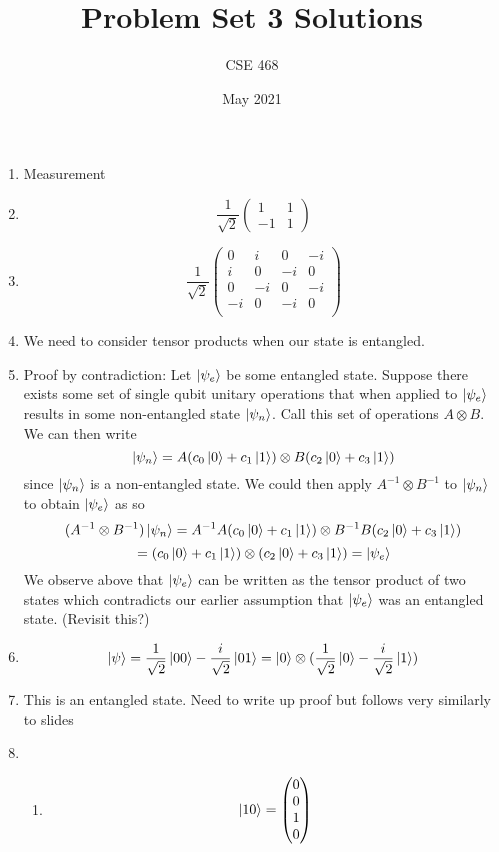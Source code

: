 \documentclass[12pt]{article}
\title{Problem Set 3 Solutions}
\author{CSE 468}
\date{May 2021}
\begin{document}
\maketitle

\begin{enumerate}[font=\bfseries]
    \item Measurement
    \item \[ \frac{1}{\sqrt{2}}\begin{pmatrix}
        1 & 1 \\
        -1 & 1
        \end{pmatrix}
        \]
    \item \[ \frac{1}{\sqrt{2}}\begin{pmatrix}
        0 & i & 0 & -i \\
        i & 0 & -i & 0 \\
        0 & -i & 0 & -i \\
        -i & 0 & -i & 0 \\
        \end{pmatrix}
        \]
    \item We need to consider tensor products when our state is entangled.
    \item Proof by contradiction: Let $\ket{\psi_e}$ be some entangled state. Suppose there exists some set of single qubit unitary operations that when applied to $\ket{\psi_e}$ results in some non-entangled state $\ket{\psi_n}$. Call this set of operations $A \otimes B$. We can then write
    \[\ket{\psi_n} = A(c_0\ket{0}+c_1\ket{1}) \otimes B(c_2\ket{0}+c_3\ket{1})\]
    since $\ket{\psi_n}$ is a non-entangled state. We could then apply $A^{-1} \otimes B^{-1}$ to $\ket{\psi_n}$ to obtain $\ket{\psi_e}$ as so
    \[(A^{-1} \otimes B^{-1})\ket{\psi_n} = A^{-1}A(c_0\ket{0}+c_1\ket{1}) \otimes B^{-1}B(c_2\ket{0}+c_3\ket{1})\]
    \[= (c_0\ket{0}+c_1\ket{1}) \otimes (c_2\ket{0}+c_3\ket{1}) = \ket{\psi_e}\]
    We observe above that $\ket{\psi_e}$ can be written as the tensor product of two states which contradicts our earlier assumption that $\ket{\psi_e}$ was an entangled state. (Revisit this?)
    \item \[\ket{\psi} = \frac{1}{\sqrt{2}}\ket{00} - \frac{i}{\sqrt{2}}\ket{01} = \ket{0} \otimes (\frac{1}{\sqrt{2}}\ket{0} - \frac{i}{\sqrt{2}}\ket{1})\]
    \item This is an entangled state. Need to write up proof but follows very similarly to slides
    \item \begin{enumerate}
            \item \[\ket{10} = \begin{pmatrix} 0 \\ 0 \\ 1 \\0          \end{pmatrix}\]

\end{enumerate}
\end{enumerate}
\end{document}
